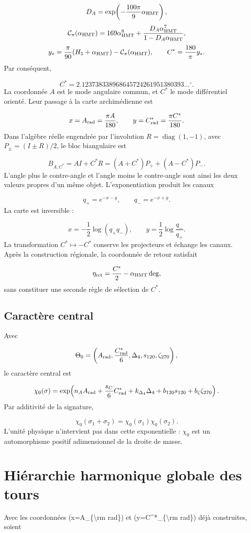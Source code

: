\[
 D_A=\exp\!\left(-\frac{100\pi}{9}\alpha_{\rm HMT}\right),
\]
\[
 \mathcal C_\pi(\alpha_{\rm HMT})
 =169\alpha_{\rm HMT}^{6}
 +\frac{D_A\alpha_{\rm HMT}^{7}}
        {1-D_A\alpha_{\rm HMT}},
\]
\[
 y_*=\frac{\pi}{90}(H_5+\alpha_{\rm HMT})
      -\mathcal C_\pi(\alpha_{\rm HMT}),
 \qquad
 C^*=\frac{180}{\pi}y_*.
\]
Par conséquent,

\[
 C^*=2.123738338968645724261951380393\ldots{}^\circ.
\]
La coordonnée \(A\) est le mode angulaire commun, et \(C^*\) le mode différentiel orienté. Leur passage à la carte archimédienne est

\[
 x=A_{\rm rad}=\frac{\pi A}{180},
 \qquad
 y=C^*_{\rm rad}=\frac{\pi C^*}{180}.
\]
Dans l'algèbre réelle engendrée par l'involution \(R=\operatorname{diag}(1,-1)\), avec \(P_\pm=(I\pm R)/2\), le bloc biangulaire est

\[
 B_{A,C^*}=AI+C^*R
 =(A+C^*)P_++(A-C^*)P_-.
\]
L'angle plus le contre-angle et l'angle moins le contre-angle sont ainsi les deux valeurs propres d'un même objet. L'exponentiation produit les canaux

\[
 q_+=e^{-x-y},\qquad q_-=e^{-x+y}.
\]
La carte est inversible :

\[
 x=-\frac12\log(q_+q_-),
 \qquad
 y=\frac12\log\frac{q_-}{q_+}.
\]
La transformation \(C^*\mapsto-C^*\) conserve les projecteurs et échange les canaux. Après la construction régionale, la coordonnée de retour satisfait

\[
 \eta_{\rm ret}=\frac{C^*}{2}-\alpha_{\rm HMT}\,{\rm deg},
\]
sans constituer une seconde règle de sélection de \(C^*\).

\subsection{Caractère central}
Avec

\[
 \Theta_0=
 \left(A_{\rm rad},\frac{C^*_{\rm rad}}6,
 \Delta_4,s_{120},\zeta_{270}\right),
\]
le caractère central est

\[
 \chi_0(\sigma)=
 \exp\!\left(
 n_AA_{\rm rad}+\frac{s_C}{6}C^*_{\rm rad}
 +k_{\Delta_4}\Delta_4+b_{120}s_{120}+b_\zeta\zeta_{270}
 \right).
\]
Par additivité de la signature,

\[
 \chi_0(\sigma_1+\sigma_2)=\chi_0(\sigma_1)\chi_0(\sigma_2).
\]
L'unité physique n'intervient pas dans cette exponentielle : \(\chi_0\) est un automorphisme positif adimensionnel de la droite de masse.

\section{Hiérarchie harmonique globale des tours}
Avec les coordonnées (x=\allowbreak{}A\_\{\textbackslash{}rm rad\}) et (y=\allowbreak{}C\textasciicircum{}*\_\{\textbackslash{}rm rad\}) déjà construites, soient

